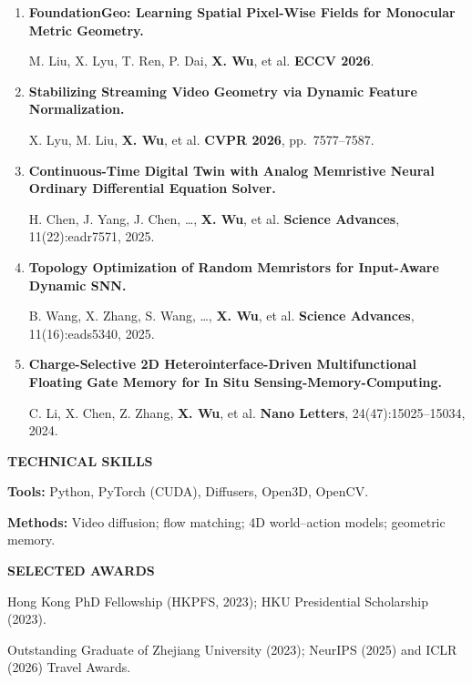 \documentclass[a4paper]{article}
\newcommand{\cvsection}[1]{%
  \par\vspace{2.0pt}%
  {\color{cvblue}\fontsize{11}{12.2}\selectfont\bfseries\MakeUppercase{#1}}\par
  \vspace{-4pt}{\color{cvblue}\rule{\textwidth}{0.4pt}}\par\vspace{1.0pt}%
}
\begin{document}
{\begin{enumerate}[resume,leftmargin=1.6em,labelsep=0.38em,itemsep=0.4pt,topsep=1.3pt,parsep=0pt,partopsep=0pt]
M. Liu, T. Liu, J. Xia, X. Lyu, \textbf{X. Wu}, et al. \hfill \textbf{CoRL 2026}.
\item \textbf{FoundationGeo: Learning Spatial Pixel-Wise Fields for Monocular Metric Geometry.}\par
M. Liu, X. Lyu, T. Ren, P. Dai, \textbf{X. Wu}, et al. \hfill \textbf{ECCV 2026}.
\item \textbf{Stabilizing Streaming Video Geometry via Dynamic Feature Normalization.}\par
X. Lyu, M. Liu, \textbf{X. Wu}, et al. \hfill \textbf{CVPR 2026}, pp.\ 7577--7587.
\item \textbf{Continuous-Time Digital Twin with Analog Memristive Neural Ordinary Differential Equation Solver.}\par
H. Chen, J. Yang, J. Chen, \ldots, \textbf{X. Wu}, et al. \hfill \textbf{Science Advances}, 11(22):eadr7571, 2025.
\item \textbf{Topology Optimization of Random Memristors for Input-Aware Dynamic SNN.}\par
B. Wang, X. Zhang, S. Wang, \ldots, \textbf{X. Wu}, et al. \hfill \textbf{Science Advances}, 11(16):eads5340, 2025.
\item \textbf{Charge-Selective 2D Heterointerface-Driven Multifunctional Floating Gate Memory for In Situ Sensing-Memory-Computing.}\par
C. Li, X. Chen, Z. Zhang, \textbf{X. Wu}, et al. \hfill \textbf{Nano Letters}, 24(47):15025--15034, 2024.
\end{enumerate}}

\cvsection{Technical Skills}
\textbf{Tools:} Python, PyTorch (CUDA), Diffusers, Open3D, OpenCV.\par
\textbf{Methods:} Video diffusion; flow matching; 4D world--action models; geometric memory.


\cvsection{Selected Awards}
Hong Kong PhD Fellowship (HKPFS, 2023); HKU Presidential Scholarship (2023).\par
Outstanding Graduate of Zhejiang University (2023); NeurIPS (2025) and ICLR (2026) Travel Awards.
\end{document}
